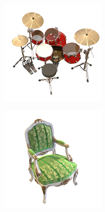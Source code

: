 \documentclass{article}
\begin{document}
\begin{figure}[!h]
\begin{subfigure}{.24\textwidth}
  \includegraphics[width=\linewidth]{figs/results/drums_ref.png}  
\end{subfigure}
\begin{subfigure}{.24\textwidth}
  \centering
  \includegraphics[width=\linewidth]{figs/results/chair_ref.png}  

\end{subfigure}
\end{figure}
\end{document}

